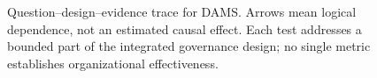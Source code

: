 \begin{figure}[htbp]
\begin{singlespace}
\begin{tikzpicture}
\end{tikzpicture}
\end{singlespace}
\caption{Question--design--evidence trace for DAMS. Arrows mean logical dependence, not an estimated causal effect. Each test addresses a bounded part of the integrated governance design; no single metric establishes organizational effectiveness.}
\label{fig:traceability}
\end{figure}
